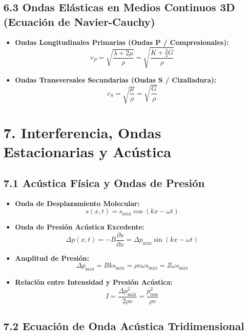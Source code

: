 \documentclass[11pt,a4paper]{article}
\begin{document}
\subsection*{6.3 Ondas Elásticas en Medios Continuos 3D (Ecuación de Navier-Cauchy)}

\begin{itemize}
  \item \textbf{Ondas Longitudinales Primarias (Ondas P / Compresionales):}
  \[
    v_P = \sqrt{\frac{\lambda + 2\mu}{\rho}} = \sqrt{\frac{K + \frac{4}{3}G}{\rho}}
  \]
  \item \textbf{Ondas Transversales Secundarias (Ondas S / Cizalladura):}
  \[
    v_S = \sqrt{\frac{\mu}{\rho}} = \sqrt{\frac{G}{\rho}}
  \]
\end{itemize}

\section*{7. Interferencia, Ondas Estacionarias y Acústica}

\subsection*{7.1 Acústica Física y Ondas de Presión}

\begin{itemize}
  \item \textbf{Onda de Desplazamiento Molecular:}
  \[
    s(x, t) = s_{\mathrm{máx}} \cos(kx - \omega t)
  \]
  \item \textbf{Onda de Presión Acústica Excedente:}
  \[
    \Delta p(x, t) = -B \frac{\partial s}{\partial x} = \Delta p_{\mathrm{máx}} \sin(kx - \omega t)
  \]
  \item \textbf{Amplitud de Presión:}
  \[
    \Delta p_{\mathrm{máx}} = B k s_{\mathrm{máx}} = \rho v \omega s_{\mathrm{máx}} = Z \omega s_{\mathrm{máx}}
  \]
  \item \textbf{Relación entre Intensidad y Presión Acústica:}
  \[
    I = \frac{\Delta p_{\mathrm{máx}}^2}{2\rho v} = \frac{p_{\mathrm{rms}}^2}{\rho v}
  \]
\end{itemize}

\subsection*{7.2 Ecuación de Onda Acústica Tridimensional}
\end{document}
